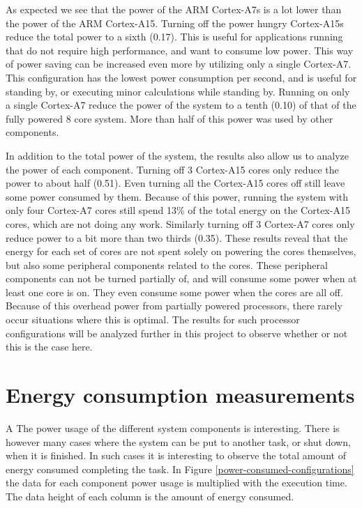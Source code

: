 As expected we see that the power of the ARM Cortex-A7s is a lot lower than the power of the ARM Cortex-A15.
Turning off the power hungry Cortex-A15s reduce the total power to a sixth (0.17).
This is useful for applications running that do not require high performance, and  want to consume low power.
This way of power saving can be increased even more by utilizing only a single Cortex-A7.
This configuration has the lowest power consumption per second, and is useful for standing by, or executing minor calculations while standing by.
Running on only a single Cortex-A7 reduce the power of the system to a tenth (0.10) of that of the fully powered 8 core system.
More than half of this power was used by other components.

In addition to the total power of the system, the results also allow us to analyze the power of each component.
Turning off 3 Cortex-A15 cores only reduce the power to about half (0.51).
Even turning all the Cortex-A15 cores off still leave some power consumed by them.
Because of this power, running the system with only four Cortex-A7 cores still spend 13\% of the total energy on the Cortex-A15 cores, which are not doing any work.
Similarly turning off 3 Cortex-A7 cores only reduce power to a bit more than two thirds (0.35).
These results reveal that the energy for each set of cores are not spent solely on powering the cores themselves, but also some peripheral components related to the cores.
These peripheral components can not be turned partially of, and will consume some power when at least one core is on.
They even consume some power when the cores are all off.
Because of this overhead power from partially powered processors, there rarely occur situations where this is optimal.
The results for such processor configurations will be analyzed further in this project to observe whether or not this is the case here.

\section{Energy consumption measurements}A \label{energyconsumptionmeasurements}
The power usage of the different system components is interesting.
There is however many cases where the system can be put to another task, or shut down, when it is finished.
In such cases it is interesting to observe the total amount of energy consumed completing the task.
In Figure \ref{power-consumed-configurations} the data for each component power usage is multiplied with the execution time.
The data height of each column is the amount of energy consumed.

